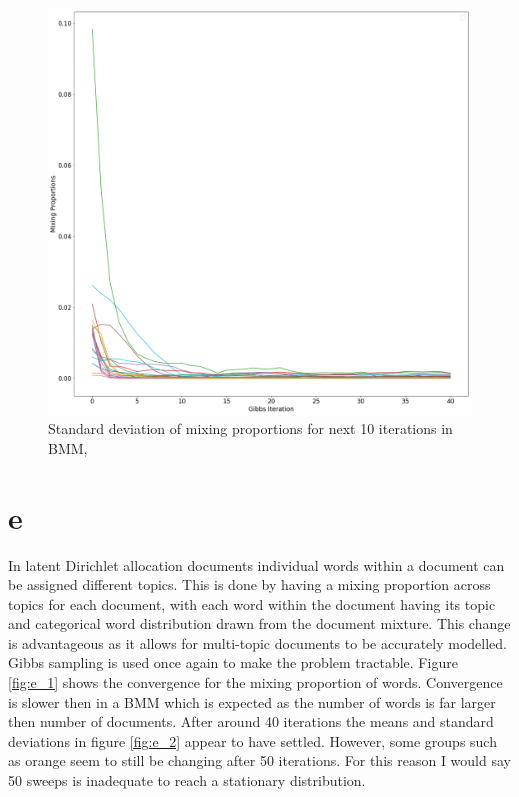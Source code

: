 \documentclass[twoside,twocolumn]{article}
\begin{document}
\begin{figure}[h]
  \centering
    \includegraphics[width=\linewidth]{d_2}
  \caption{Standard deviation of mixing proportions for next 10 iterations in BMM, }
  \label{fig:d_2}
\end{figure}

\section{e}
In latent Dirichlet allocation documents individual words within a document can be assigned different topics. This is done by having a mixing proportion across topics for each document, with each word within the document having its topic and categorical word distribution drawn from the document mixture. This change is advantageous as it allows for multi-topic documents to be accurately modelled. Gibbs sampling is used once again to make the problem tractable. Figure \ref{fig:e_1} shows the convergence for the mixing proportion of words. Convergence is slower then in a BMM which is expected as the number of words is far larger then number of documents. After around 40 iterations the means and standard deviations in figure \ref{fig:e_2} appear to have settled. However, some groups such as orange seem to still be changing after 50 iterations. For this reason I would say 50 sweeps is inadequate to reach a stationary distribution. 
\end{document}
